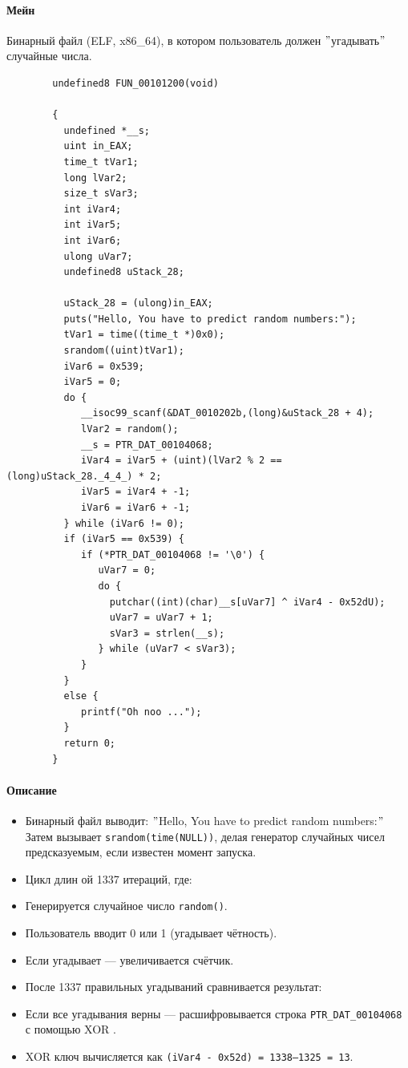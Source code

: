 \paragraph{Мейн}
Бинарный файл (ELF, x86\_64), в котором пользователь должен \("\)угадывать\("\) случайные числа.
\begin{verbatim}
        undefined8 FUN_00101200(void)

        {
          undefined *__s;
          uint in_EAX;
          time_t tVar1;
          long lVar2;
          size_t sVar3;
          int iVar4;
          int iVar5;
          int iVar6;
          ulong uVar7;
          undefined8 uStack_28;

          uStack_28 = (ulong)in_EAX;
          puts("Hello, You have to predict random numbers:");
          tVar1 = time((time_t *)0x0);
          srandom((uint)tVar1);
          iVar6 = 0x539;
          iVar5 = 0;
          do {
             __isoc99_scanf(&DAT_0010202b,(long)&uStack_28 + 4);
             lVar2 = random();
             __s = PTR_DAT_00104068;
             iVar4 = iVar5 + (uint)(lVar2 % 2 == (long)uStack_28._4_4_) * 2;
             iVar5 = iVar4 + -1;
             iVar6 = iVar6 + -1;
          } while (iVar6 != 0);
          if (iVar5 == 0x539) {
             if (*PTR_DAT_00104068 != '\0') {
                uVar7 = 0;
                do {
                  putchar((int)(char)__s[uVar7] ^ iVar4 - 0x52dU);
                  uVar7 = uVar7 + 1;
                  sVar3 = strlen(__s);
                } while (uVar7 < sVar3);
             }
          }
          else {
             printf("Oh noo ...");
          }
          return 0;
        }
\end{verbatim}

\paragraph{Описание}
\begin{itemize}
    \item Бинарный файл выводит: \("\)Hello, You have to predict random numbers:\("\)
    Затем вызывает \texttt{srandom(time(NULL))}, делая генератор случайных чисел предсказуемым, если известен момент запуска.

    \item Цикл длин ой 1337 итераций, где:
    \item Генерируется случайное число \texttt{random()}.
    \item Пользователь вводит 0 или 1 (угадывает чётность).
    \item Если угадывает — увеличивается счётчик.
    \item После 1337 правильных угадываний сравнивается результат:
    \item Если все угадывания верны — расшифровывается строка \texttt{PTR\_DAT\_00104068} с помощью XOR .
    \item XOR ключ вычисляется как \texttt{(iVar4 - 0x52d) = 1338--1325 = 13}.
\end{itemize}

